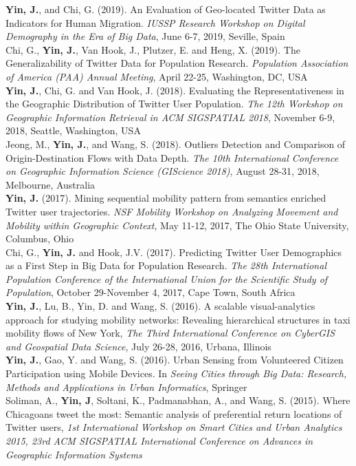 \documentclass[11pt, a4paper]{article}
\newcommand{\years}[1]{\marginnote{\scriptsize #1}}
\begin{document}
\years{2019}\textbf{Yin, J.}, and Chi, G. (2019). An Evaluation of Geo-located Twitter Data as Indicators for Human Migration. \textit{IUSSP Research Workshop on Digital Demography in the Era of Big Data}, June 6-7, 2019, Seville, Spain\\
\years{2019}Chi, G., \textbf{Yin, J.}, Van Hook, J., Plutzer, E. and Heng, X. (2019). The Generalizability of Twitter Data for Population Research. \textit{Population Association of America (PAA) Annual Meeting}, April 22-25, Washington, DC, USA\\
\years{2018}\textbf{Yin, J.}, Chi, G. and Van Hook, J. (2018). Evaluating the Representativeness in the Geographic Distribution of Twitter User Population. \textit{The 12th Workshop on Geographic Information Retrieval in ACM SIGSPATIAL 2018}, November 6-9, 2018, Seattle, Washington, USA\\
\years{2018}Jeong, M., \textbf{Yin, J.}, and Wang, S. (2018). Outliers Detection and Comparison of Origin-Destination Flows with Data Depth. \textit{The 10th International Conference on Geographic Information Science (GIScience 2018)}, August 28-31, 2018, Melbourne, Australia\\
\years{2017}\textbf{Yin, J.} (2017). Mining sequential mobility pattern from semantics enriched Twitter user trajectories. \textit{NSF Mobility Workshop on Analyzing Movement and Mobility within Geographic Context}, May 11-12, 2017, The Ohio State University, Columbus, Ohio\\
\years{2017}Chi, G., \textbf{Yin, J.} and Hook, J.V. (2017). Predicting Twitter User Demographics as a First Step in Big Data for Population Research. \textit{The 28th International Population Conference of the International Union for the Scientific Study of Population}, October 29-November 4, 2017, Cape Town, South Africa\\
\years{2016}\textbf{Yin, J.}, Lu, B., Yin, D. and Wang, S. (2016). A scalable visual-analytics approach for studying mobility networks: Revealing hierarchical structures in taxi mobility flows of New York, \textit{The Third International Conference on CyberGIS and Geospatial Data Science}, July 26-28, 2016, Urbana, Illinois\\
\years{2016}\textbf{Yin, J.}, Gao, Y. and Wang, S. (2016). Urban Sensing from Volunteered Citizen Participation using Mobile Devices. In \emph{Seeing Cities through Big Data: Research, Methods and Applications in Urban Informatics}, Springer\\
\years{2015}Soliman, A., \textbf{Yin, J}, Soltani, K., Padmanabhan, A., and Wang, S. (2015). Where Chicagoans tweet the most: Semantic analysis of preferential return locations of Twitter users, \textit{1st International Workshop on Smart Cities and Urban Analytics 2015, 23rd ACM SIGSPATIAL International Conference on Advances in Geographic Information Systems}\\ 
\end{document}
